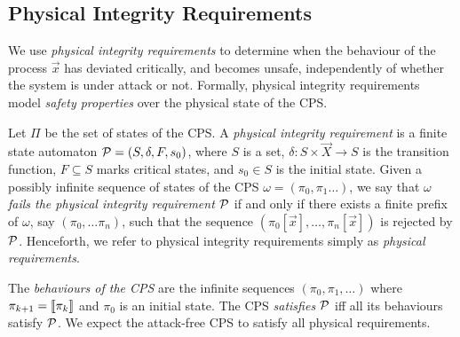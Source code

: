 \subsection{Physical Integrity Requirements}{
We use \emph{physical integrity requirements} to determine when the behaviour of the process $\vec{x}$ has deviated critically, and becomes unsafe, independently of whether the system is under attack or not. Formally, physical integrity requirements model \emph{safety properties} over the physical state of the CPS.
\begin{definition}
  \label{def:CPSRobustness:IntegrityRequirement}
  Let $\Pi$ be the set of states of the CPS. A \emph{physical integrity requirement} is a finite state automaton $\mathcal{P}=(S,\delta,F,s_0)$, where $S$ is a set, $\delta\colon S\times \vec{X}\rightarrow S$ is the transition function, $F\subseteq S$ marks critical states, and $s_0\in S$ is the initial state. Given a possibly infinite sequence of states of the CPS $\omega=(\pi_0,\pi_1 \ldots)$, we say that \emph{$\omega$ fails the physical integrity requirement $\mathcal{P}$} if and only if there exists a finite prefix of $\omega$, say $(\pi_0,\ldots\pi_n)$, such that the sequence $(\pi_0[\vec{x}],\ldots, \pi_n[\vec{x}])$ is rejected by $\mathcal{P}$. Henceforth, we refer to physical integrity requirements simply as \emph{physical requirements}. 
  
The \emph{behaviours of the CPS} are the infinite sequences $(\pi_0, \pi_1, \ldots)$ where $\pi_{k+1}={{\llbracket\pi_k\rrbracket}}$ and $\pi_0$ is an initial state. The CPS \emph{satisfies  $\mathcal{P}$} iff all its behaviours satisfy $\mathcal{P}$. We expect the attack-free CPS to satisfy all physical requirements.
\end{definition}
   

}
